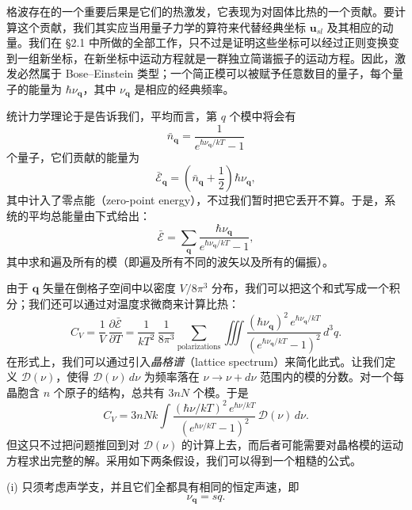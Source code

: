格波存在的一个重要后果是它们的热激发，它表现为对固体比热的一个贡献。要计算这个贡献，我们其实应当用量子力学的算符来代替经典坐标 $\mathbf{u}_{sl}$ 及其相应的动量。我们在 §2.1 中所做的全部工作，只不过是证明这些坐标可以经过正则变换变到一组新坐标，在新坐标中运动方程就是一群独立简谐振子的运动方程。因此，激发必然属于 Bose–Einstein 类型；一个简正模可以被赋予任意数目的量子，每个量子的能量为 $\hbar\nu_{\mathbf{q}}$，其中 $\nu_{\mathbf{q}}$ 是相应的经典频率。

统计力学理论于是告诉我们，平均而言，第 $q$ 个模中将会有
\begin{equation*}
\bar{n}_{\mathbf{q}} = \frac{1}{e^{\hbar\nu_{\mathbf{q}}/kT}-1}
\tag{2.46}
\end{equation*}
个量子，它们贡献的能量为
\begin{equation*}
\bar{\mathcal{E}}_{\mathbf{q}} = \left(\bar{n}_{\mathbf{q}} + \frac{1}{2}\right)\hbar\nu_{\mathbf{q}},
\tag{2.47}
\end{equation*}
其中计入了零点能（zero-point energy），不过我们暂时把它丢开不算。于是，系统的平均总能量由下式给出：
\begin{equation*}
\bar{\mathcal{E}} = \sum_{\mathbf{q}} \frac{\hbar\nu_{\mathbf{q}}}{e^{\hbar\nu_{\mathbf{q}}/kT}-1},
\tag{2.48}
\end{equation*}
其中求和遍及所有的模（即遍及所有不同的波矢以及所有的偏振）。

由于 $\mathbf{q}$ 矢量在倒格子空间中以密度 $V/8\pi^3$ 分布，我们可以把这个和式写成一个积分；我们还可以通过对温度求微商来计算比热：
\begin{equation*}
C_V = \frac{1}{V}\,\frac{\partial\bar{\mathcal{E}}}{\partial T} = \frac{1}{kT^2}\,\frac{1}{8\pi^3}\sum_{\text{polarizations}} \iiint \frac{(\hbar\nu_{\mathbf{q}})^2\, e^{\hbar\nu_{\mathbf{q}}/kT}}{(e^{\hbar\nu_{\mathbf{q}}/kT}-1)^2}\, d^3q.
\tag{2.49}
\end{equation*}
在形式上，我们可以通过引入\emph{晶格谱}（lattice spectrum）来简化此式。让我们定义 $\mathcal{D}(\nu)$，使得 $\mathcal{D}(\nu)\,d\nu$ 为频率落在 $\nu\to\nu+d\nu$ 范围内的模的分数。对一个每晶胞含 $n$ 个原子的结构，总共有 $3nN$ 个模。于是
\begin{equation*}
C_V = 3nNk \int \frac{(\hbar\nu/kT)^2\, e^{\hbar\nu/kT}}{(e^{\hbar\nu/kT}-1)^2}\,\mathcal{D}(\nu)\, d\nu.
\tag{2.50}
\end{equation*}
但这只不过把问题推回到对 $\mathcal{D}(\nu)$ 的计算上去，而后者可能需要对晶格模的运动方程求出完整的解。采用如下两条假设，我们可以得到一个粗糙的公式。

(i) 只须考虑声学支，并且它们全都具有相同的恒定声速，即
\begin{equation*}
\nu_{\mathbf{q}} = sq.
\tag{2.51}
\end{equation*}

